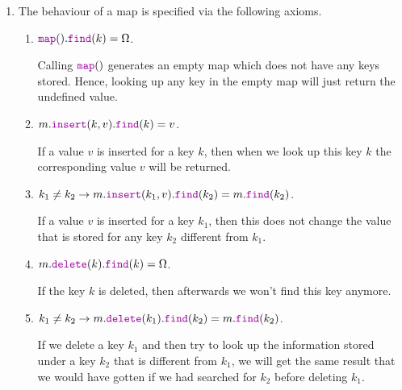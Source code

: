 \begin{Definition}[Map]
\begin{enumerate}
\begin{enumerate}
              The function call
              \\[0.2cm]
              \hspace*{1.3cm}
              $m.\mytt{delete}(k)$ 
              \\[0.2cm]
              removes the key $k$ and any value associated with $k$ from the map $m$.  If the map $m$ does not contain a value for the
              key $k$, then the map is returned unchanged.

              The function call returns the new map. 
        \end{enumerate}
  \item The behaviour of a map is specified via the following axioms.
        \begin{enumerate}
        \item $\mytt{map}().\mytt{find}(k) = \Omega$.

              Calling $\mytt{map}()$ generates an empty map which does not have any keys stored.
              Hence, looking up any key in the empty map will just return the undefined value.
        \item $m.\mytt{insert}(k, v).\mytt{find}(k) = v$.

              If a value $v$ is inserted for a key $k$, then when we look up this key $k$ the corresponding value
              $v$ will be returned.
        \item $k_1 \not= k_2 \rightarrow m.\mytt{insert}(k_1, v).\mytt{find}(k_2) = m.\mytt{find}(k_2)$.

              If a value $v$ is inserted for a key $k_1$, then this does not change the value that is stored
              for any key $k_2$  different from $k_1$.
        \item $m.\mytt{delete}(k).\mytt{find}(k) = \Omega$.

              If the key $k$ is deleted, then afterwards we won't find this key anymore.
        \item $k_1 \not= k_2 \rightarrow 
               m.\mytt{delete}(k_1).\mytt{find}(k_2) = m.\mytt{find}(k_2)$.

              If  we delete a key $k_1$ and then try to look up the information stored under a key
              $k_2$ that is different from $k_1$, we will get the same result that we would have gotten
              if we had searched for $k_2$ before deleting $k_1$.
              \eox
        \end{enumerate}
  \end{enumerate}
\end{Definition}

